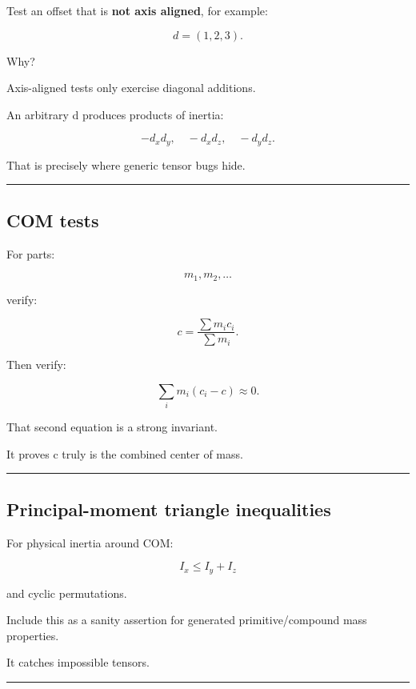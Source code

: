 Test an offset that is \textbf{not axis aligned}, for example:

\[
d=(1,2,3).
\]

Why?

Axis-aligned tests only exercise diagonal additions.

An arbitrary d produces products of inertia:

\[
-d_xd_y,
\quad
-d_xd_z,
\quad
-d_yd_z.
\]

That is precisely where generic tensor bugs hide.

\begin{center}\rule{0.5\linewidth}{0.5pt}\end{center}

\subsection{COM tests}\label{06-engine-ii-ch039-com-tests}

For parts:

\[
m_1,m_2,\ldots
\]

verify:

\[
c
=
\frac{\sum m_ic_i}{\sum m_i}.
\]

Then verify:

\[
\sum_i
m_i(c_i-c)
\approx0.
\]

That second equation is a strong invariant.

It proves c truly is the combined center of mass.

\begin{center}\rule{0.5\linewidth}{0.5pt}\end{center}

\subsection{Principal-moment triangle inequalities}\label{06-engine-ii-ch039-principal-moment-triangle-inequalities}

For physical inertia around COM:

\[
I_x\le I_y+I_z
\]

and cyclic permutations.

Include this as a sanity assertion for generated primitive/compound mass properties.

It catches impossible tensors.

\begin{center}\rule{0.5\linewidth}{0.5pt}\end{center}


